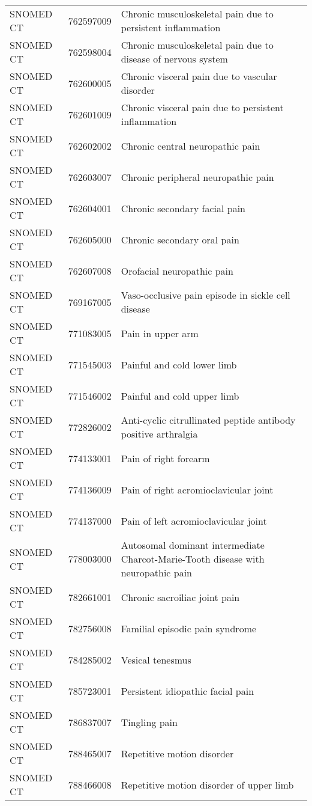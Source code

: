 \begin{longtable}{p{}p{}p{}}
  SNOMED CT & 762597009 & Chronic musculoskeletal pain due to persistent inflammation \\ 
  SNOMED CT & 762598004 & Chronic musculoskeletal pain due to disease of nervous system \\ 
  SNOMED CT & 762600005 & Chronic visceral pain due to vascular disorder \\ 
  SNOMED CT & 762601009 & Chronic visceral pain due to persistent inflammation \\ 
  SNOMED CT & 762602002 & Chronic central neuropathic pain \\ 
  SNOMED CT & 762603007 & Chronic peripheral neuropathic pain \\ 
  SNOMED CT & 762604001 & Chronic secondary facial pain \\ 
  SNOMED CT & 762605000 & Chronic secondary oral pain \\ 
  SNOMED CT & 762607008 & Orofacial neuropathic pain \\ 
  SNOMED CT & 769167005 & Vaso-occlusive pain episode in sickle cell disease \\ 
  SNOMED CT & 771083005 & Pain in upper arm \\ 
  SNOMED CT & 771545003 & Painful and cold lower limb \\ 
  SNOMED CT & 771546002 & Painful and cold upper limb \\ 
  SNOMED CT & 772826002 & Anti-cyclic citrullinated peptide antibody positive arthralgia \\ 
  SNOMED CT & 774133001 & Pain of right forearm \\ 
  SNOMED CT & 774136009 & Pain of right acromioclavicular joint \\ 
  SNOMED CT & 774137000 & Pain of left acromioclavicular joint \\ 
  SNOMED CT & 778003000 & Autosomal dominant intermediate Charcot-Marie-Tooth disease with neuropathic pain \\ 
  SNOMED CT & 782661001 & Chronic sacroiliac joint pain \\ 
  SNOMED CT & 782756008 & Familial episodic pain syndrome \\ 
  SNOMED CT & 784285002 & Vesical tenesmus \\ 
  SNOMED CT & 785723001 & Persistent idiopathic facial pain \\ 
  SNOMED CT & 786837007 & Tingling pain \\ 
  SNOMED CT & 788465007 & Repetitive motion disorder \\ 
  SNOMED CT & 788466008 & Repetitive motion disorder of upper limb \\ 

\end{longtable}
